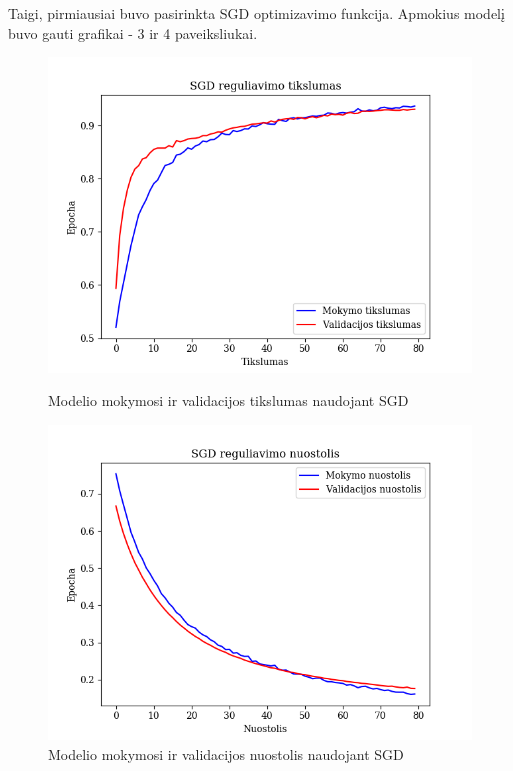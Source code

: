\documentclass{VUMIFPSkursinis}
\begin{document}
Taigi, pirmiausiai buvo pasirinkta SGD optimizavimo funkcija. Apmokius modelį buvo gauti grafikai - 3 ir 4 paveiksliukai.

\begin{figure}[!htbp]
  \centering
  \begin{minipage}[b]{0.49\textwidth}
    \includegraphics[width=\textwidth]{img/FT/SGD_acc.png}
    \caption{Modelio mokymosi ir validacijos tikslumas naudojant SGD}
  \end{minipage}
  \begin{minipage}[b]{0.49\textwidth}
    \includegraphics[width=\textwidth]{img/FT/SGD_loss.png}
    \caption{Modelio mokymosi ir validacijos nuostolis naudojant SGD}
  \end{minipage}
\end{figure}
\end{document}
